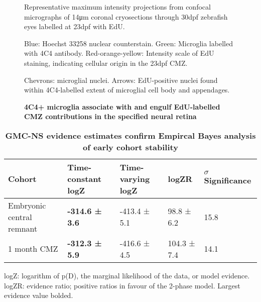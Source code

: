 \begin{figure}[!h]
    \caption{{\bf 4C4+ microglia associate with and engulf EdU-labelled CMZ contributions in the specified neural retina}}
    Representative maximum intensity projections from confocal micrographs of 14\si{\micro\metre} coronal cryosections through 30dpf zebrafish eyes labelled at 23dpf with EdU.
    
    Blue: Hoechst 33258 nuclear counterstain. Green: Microglia labelled with 4C4 antibody. Red-orange-yellow: Intensity scale of EdU staining, indicating cellular origin in the 23dpf CMZ.

    Chevrons: microglial nuclei. Arrows: EdU-positive nuclei found within 4C4-labelled extent of microglial cell body and appendages.
    \label{4C4micrograph}
\end{figure}

\begin{table}[!ht]
    \centering
    \caption{{\bf GMC-NS evidence estimates confirm Empircal Bayes analysis of early cohort stability}}
    \begin{tabular}{|l|l|l|l|l|} \hline 
        {\bf Cohort} & {\bf Time-constant logZ} & {\bf Time-varying logZ} & {\bf logZR} & {\bf $\sigma$ Significance}\\ \hline
        Embryonic central remnant & {\bf -314.6 ± 3.6} & -413.4 ± 5.1 & 98.8 ± 6.2 & 15.8\\ \hline
        1 month CMZ & {\bf -312.3 ± 5.9} & -416.6 ± 4.5 & 104.3 ± 7.4 & 14.1\\ \hline
    \end{tabular}
    \begin{flushleft} logZ: logarithm of p(D), the marginal likelihood of the data, or model evidence. logZR: evidence ratio; positive ratios in favour of the 2-phase model. Largest evidence value bolded.
    \end{flushleft}
    \label{turnoverGMCtable}
\end{table}


